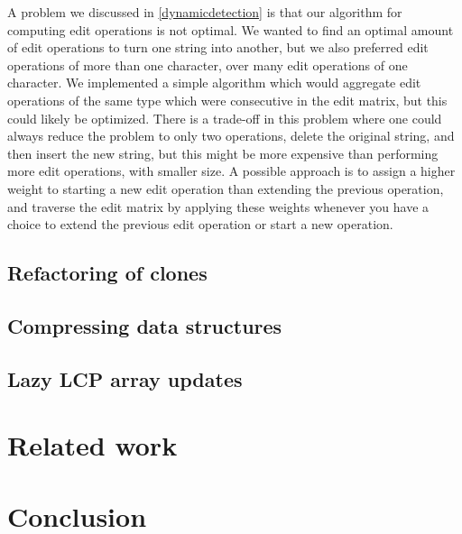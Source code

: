 A problem we discussed in \cref{dynamicdetection} is that our algorithm for computing edit
operations is not optimal. We wanted to find an optimal amount of edit operations to turn
one string into another, but we also preferred edit operations of more than one character,
over many edit operations of one character. We implemented a simple algorithm which would
aggregate edit operations of the same type which were consecutive in the edit matrix, but
this could likely be optimized. There is a trade-off in this problem where one could
always reduce the problem to only two operations, delete the original string, and then
insert the new string, but this might be more expensive than performing more edit
operations, with smaller size. A possible approach is to assign a higher weight to
starting a new edit operation than extending the previous operation, and traverse the edit
matrix by applying these weights whenever you have a choice to extend the previous edit
operation or start a new operation.

\subsection*{Refactoring of clones}

\subsection*{Compressing data structures}

\subsection*{Lazy LCP array updates}

\section{Related work}


\section{Conclusion}
